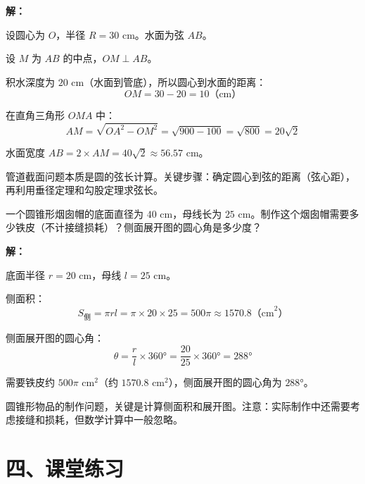 \documentclass[12pt, a4paper]{ctexart}
\begin{document}
\textbf{解：}

设圆心为 $O$，半径 $R = 30$ cm。水面为弦 $AB$。

设 $M$ 为 $AB$ 的中点，$OM \perp AB$。

积水深度为 $20$ cm（水面到管底），所以圆心到水面的距离：
\[
OM = 30 - 20 = 10 \text{（cm）}
\]

在直角三角形 $OMA$ 中：
\[
AM = \sqrt{OA^2 - OM^2} = \sqrt{900 - 100} = \sqrt{800} = 20\sqrt{2}
\]

水面宽度 $AB = 2 \times AM = 40\sqrt{2} \approx 56.57$ cm。

\begin{tipbox}[方法总结]
管道截面问题本质是圆的弦长计算。关键步骤：确定圆心到弦的距离（弦心距），再利用垂径定理和勾股定理求弦长。
\end{tipbox}

\vspace{6pt}

\begin{appbox}[【应用3】圆锥形烟囱帽]
一个圆锥形烟囱帽的底面直径为 $40$ cm，母线长为 $25$ cm。制作这个烟囱帽需要多少铁皮（不计接缝损耗）？侧面展开图的圆心角是多少度？
\end{appbox}

\textbf{解：}

底面半径 $r = 20$ cm，母线 $l = 25$ cm。

侧面积：
\[
S_{\text{侧}} = \pi r l = \pi \times 20 \times 25 = 500\pi \approx 1570.8 \text{（cm}^2\text{）}
\]

侧面展开图的圆心角：
\[
\theta = \frac{r}{l} \times 360° = \frac{20}{25} \times 360° = 288°
\]

需要铁皮约 $500\pi$ cm$^2$（约 $1570.8$ cm$^2$），侧面展开图的圆心角为 $288°$。

\begin{tipbox}[方法总结]
圆锥形物品的制作问题，关键是计算侧面积和展开图。注意：实际制作中还需要考虑接缝和损耗，但数学计算中一般忽略。
\end{tipbox}

\section*{\textcolor{tipgreen}{四、课堂练习}}
\end{document}
